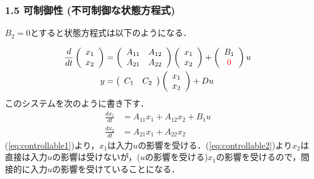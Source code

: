 \documentclass[10pt]{beamer}
\begin{document}
\begin{frame}[t]
\frametitle{1.5 可制御性 (不可制御な状態方程式)}

$B_2=0$とすると状態方程式は以下のようになる．


\begin{align}
 \frac{d}{dt}
  \left(\begin{array}{c}
         {x}_1 \\
	 {x}_2
	\end{array}\right)
  &=
  \left(\begin{array}{cc}
         {A}_{11} & {A}_{12} \\
	     {A}_{21} & {A}_{22}
	\end{array}\right)
  \left(\begin{array}{c}
         {x}_1 \\
	 {x}_2
	\end{array}\right)
  +
  \left(\begin{array}{c}
         {B}_1 \\
	 \textcolor{red}{0}
	\end{array}\right)
  u \\
 y &=
  \left(\begin{array}{cc}
         {C}_1 & {C}_2
	\end{array}\right)
  \left(\begin{array}{c}
         {x}_1 \\
	 {x}_2
	\end{array}\right)
  + D u
\end{align}
このシステムを次のように書き下す．
\begin{align}
 \frac{dx_1}{dt} &= A_{11} x_1 + A_{12} x_2 + B_1 u
 \\
 \frac{dx_2}{dt} &= A_{21} x_1 + A_{22} x_2

\end{align}
(\ref{eq:controllable1})より，$x_1$は入力$u$の影響を受ける．(\ref{eq:controllable2})より$x_2$は直接は入力$u$の影響は受けないが，($u$の影響を受ける)$x_1$の影響を受けるので，間接的に入力$u$の影響を受けていることになる．
\end{frame}
\end{document}
